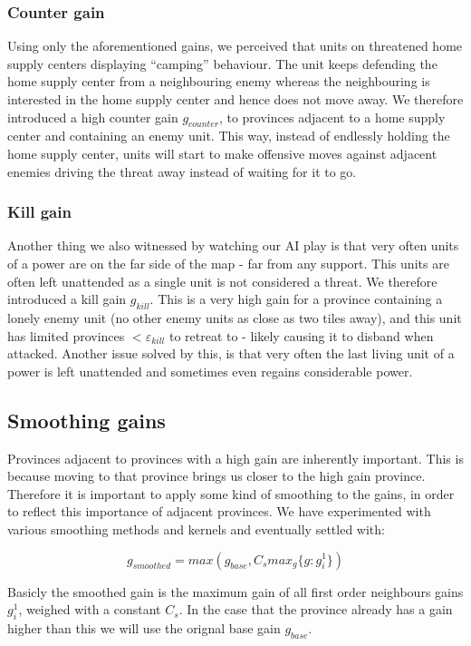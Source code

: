 \documentclass[a4paper]{article} %
\begin{document}
\subsubsection{Counter gain}
Using only the aforementioned gains, we perceived that units on threatened home supply centers displaying  ``camping'' behaviour. The unit keeps defending the home supply center from a neighbouring enemy whereas the neighbouring is interested in the home supply center and hence does not move away. We therefore introduced a high counter gain $g_{counter}$, to provinces adjacent to a home supply center and containing an enemy unit. This way, instead of endlessly holding the home supply center, units will start to make offensive moves against adjacent enemies driving the threat away instead of waiting for it to go.        

\subsubsection{Kill gain}
Another thing we also witnessed by watching our AI play is that very often units of a power are on the far side of the map - far from any support. This units are often left unattended as a single unit is not considered a threat. We therefore introduced a kill gain $g_{kill}$. This is a very high gain for a province containing a lonely enemy unit (no other enemy units as close as two tiles away), and this unit has limited provinces $< \varepsilon_{kill}$ to retreat to - likely causing it to disband when attacked. 
Another issue solved by this, is that very often the last living unit of a power is left unattended and sometimes even regains considerable power. 

\subsection{Smoothing gains}
Provinces adjacent to provinces with a high gain are inherently important. This is because moving to that province brings us closer to the high gain province. Therefore it is important to apply some kind of smoothing to the gains, in order to reflect this importance of adjacent provinces. We have experimented with various smoothing methods and kernels and eventually settled with: 

$$g_{smoothed} = max(g_{base}, C_{s} max_{g}\{g : g^1_i\})$$

Basicly the smoothed gain is the maximum gain of all first order neighbours gains $g^1_i$, weighed with a constant $C_s$. In the case that the province already has a gain higher than this we will use the orignal base gain $g_{base}$. 
\end{document}
